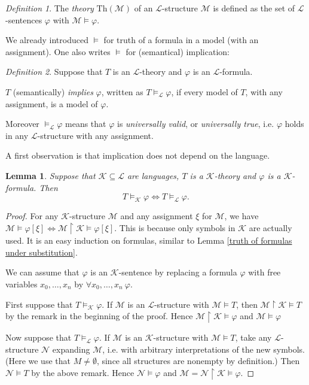 \documentclass[a4paper, 11pt]{amsart}
\newtheorem{lemma}[lemma]{Lemma}
\theoremstyle{remark}
\newtheorem{definition}[definition]{Definition}
\newcommand{\Th}{\mathrm{Th}}
\newcommand{\cL}{\mathcal L}
\newcommand{\cM}{\mathcal M}
\newcommand{\cN}{\mathcal N}
\newcommand{\cK}{\mathcal K}
\begin{document}


\begin{definition} 
The \emph{theory} $\Th(\cM)$ of an $\cL$-structure $\cM$ is defined as the set of $\cL$-sentences $\varphi$ with $\cM\models \varphi$. 
\end{definition} 


We already introduced $\models$ for truth of a formula in a model (with an assignment). 
One also writes $\models$ for (semantical) implication: 

\begin{definition} 
\label{definition - implication} 
Suppose that $T$ is an $\cL$-theory and $\varphi$ is an $\cL$-formula. 

$T$ (semantically) \emph{implies} $\varphi$, written as $T\models_\cL \varphi$, if every model of $T$, with any assignment, is a model of $\varphi$.  

Moreover $\models_\cL \varphi$ means that $\varphi$ is \emph{universally valid}, or \emph{universally true}, i.e. $\varphi$ holds in any $\cL$-structure with any assignment. 
\end{definition} 

A first observation is that implication does not depend on the language. 

\begin{lemma} 
Suppose that $\cK\subseteq \cL$ are languages, $T$ is a $\cK$-theory and $\varphi$ is a $\cK$-formula. 
Then 
$$ T\models_\cK \varphi \Longleftrightarrow T\models_\cL \varphi .$$ 
\end{lemma} 
\begin{proof} 
For any $\cK$-structure $\cM$ and any assignment $\xi$ for $\cM$, we have $\cM \models \varphi [\xi] \Longleftrightarrow \cM{\upharpoonright}\cK \models \varphi [\xi]$. 
This is because only symbols in $\cK$ are actually used. 
It is an easy induction on formulas, similar to Lemma \ref{truth of formulas under substitution}. 

We can assume that $\varphi$ is an $\cK$-sentence by replacing a formula $\varphi$ with free variables $x_0,\dots,x_n$ by $\forall x_0,\dots,x_n\ \varphi$. 

First suppose that $T\models_\cK \varphi$. 
If $\cM$ is an $\cL$-structure with $\cM\models T$, then $\cM{\upharpoonright}\cK\models T$ by the remark in the beginning of the proof. 
Hence $\cM{\upharpoonright}\cK\models \varphi$ and $\cM\models \varphi$

Now suppose that $T\models_\cL \varphi$. 
If $\cM$ is an $\cK$-structure with $\cM\models T$, take any $\cL$-structure $\cN$ expanding $\cM$, i.e. with arbitrary interpretations of the new symbols. 
(Here we use that $M\neq \emptyset$, since all structures are nonempty by definition.)
Then $\cN\models T$ by the above remark. 
Hence $\cN\models \varphi$ and $\cM = \cN{\upharpoonright}\cK\models \varphi$. 
\end{proof} 
\end{document}
